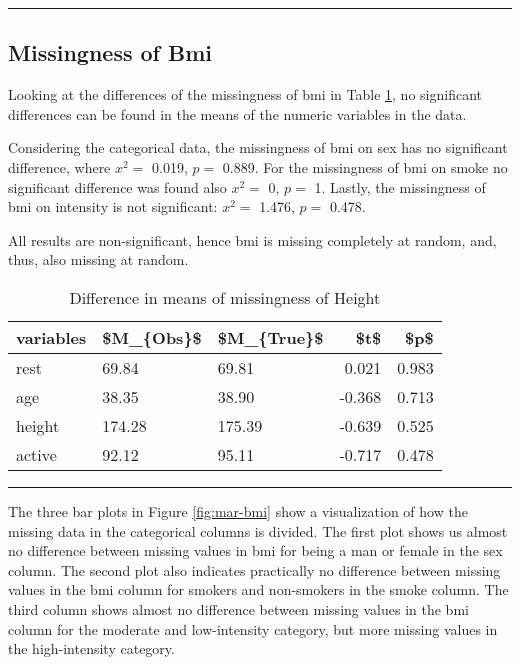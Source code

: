 \documentclass[
]{article}
\begin{document}
\begin{center}\rule{0.5\linewidth}{0.5pt}\end{center}

\hypertarget{missB}{%
\subsection{Missingness of Bmi}\label{missB}}

Looking at the differences of the missingness of bmi in Table \ref{tab:missB}, no significant differences can be found in the means of the numeric variables in the data.

Considering the categorical data, the missingness of bmi on sex has no significant difference, where \(x^2 =\) 0.019, \(p =\) 0.889. For the missingness of bmi on smoke no significant difference was found also \(x^2 =\) 0, \(p =\) 1. Lastly, the missingness of bmi on intensity is not significant: \(x^2 =\) 1.476, \(p =\) 0.478.

All results are non-significant, hence bmi is missing completely at random, and, thus, also missing at random.

\begin{table}

\caption{\label{tab:missB}Difference in means of missingness of Height}
\centering
\begin{tabular}[t]{l|l|l|r|r}
\hline
variables & \$M\_\{Obs\}\$ & \$M\_\{True\}\$ & \$t\$ & \$p\$\\
\hline
rest & 69.84 & 69.81 & 0.021 & 0.983\\
\hline
age & 38.35 & 38.90 & -0.368 & 0.713\\
\hline
height & 174.28 & 175.39 & -0.639 & 0.525\\
\hline
active & 92.12 & 95.11 & -0.717 & 0.478\\
\hline
\end{tabular}
\end{table}

\begin{center}\rule{0.5\linewidth}{0.5pt}\end{center}

The three bar plots in Figure \ref{fig:mar-bmi} show a visualization of how the missing data in the categorical columns is divided. The first plot shows us almost no difference between missing values in bmi for being a man or female in the sex column. The second plot also indicates practically no difference between missing values in the bmi column for smokers and non-smokers in the smoke column. The third column shows almost no difference between missing values in the bmi column for the moderate and low-intensity category, but more missing values in the high-intensity category.
\end{document}
